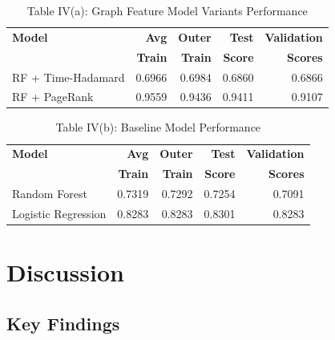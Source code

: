 \documentclass[conference]{IEEEtran}
\begin{document}
\begin{table}[H]
\centering
\small
\begin{tabular}{@{}lrrrr@{}}
\toprule
\textbf{Model} & \textbf{Avg} & \textbf{Outer} & \textbf{Test} & \textbf{Validation} \\
 & \textbf{Train} & \textbf{Train} & \textbf{Score} & \textbf{Scores} \\
\midrule
RF + Time-Hadamard & 0.6966 & 0.6984 & 0.6860 & 0.6866 \\
RF + PageRank & 0.9559 & 0.9436 & 0.9411 & 0.9107 \\
\bottomrule
\end{tabular}
\vspace{0.3cm}
\caption{Table IV(a): Graph Feature Model Variants Performance}
\end{table}
\begin{table}[H]
\centering
\small
\begin{tabular}{@{}lrrrr@{}}
\toprule
\textbf{Model} & \textbf{Avg} & \textbf{Outer} & \textbf{Test} & \textbf{Validation} \\
 & \textbf{Train} & \textbf{Train} & \textbf{Score} & \textbf{Scores} \\
\midrule
Random Forest & 0.7319 & 0.7292 & 0.7254 & 0.7091 \\
Logistic Regression & 0.8283 & 0.8283 & 0.8301 & 0.8283 \\
\bottomrule
\end{tabular}
\vspace{0.3cm}
\caption{Table IV(b): Baseline Model Performance}
\end{table}

\section{Discussion}
\subsection{Key Findings}
\end{document}
